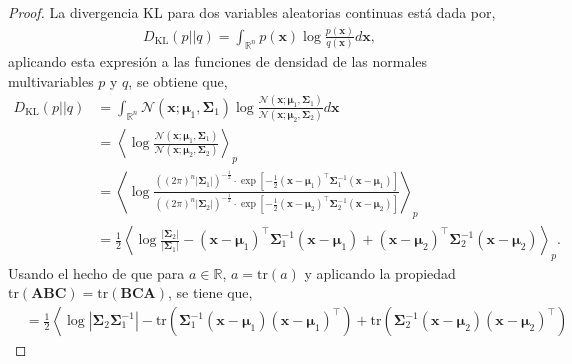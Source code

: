 \begin{proof}
    La divergencia KL para dos variables aleatorias continuas
    está dada por,
    \begin{align}
        D_{\text{KL}}(p||q) = \int_{\mathbb{R}^{n}}p(\mathbf{x})\log \frac{p(\mathbf{x})}{q(\mathbf{x})}d\mathbf{x},
    \end{align}
    aplicando esta expresión a las funciones de densidad de las normales multivariables $p$ y $q$, se obtiene que,
\begin{equation} 
    \begin{aligned}
        D_{\text{KL}}(p||q) &= \int_{\mathbb{R}^{n}} 
        \mathcal{N}(\mathbf{x}; \bm{\mu}_1, \bm{\Sigma}_1)
        \log\frac{
        \mathcal{N}(\mathbf{x}; \bm{\mu}_1, \bm{\Sigma}_1)
        }{
        \mathcal{N}(\mathbf{x}; \bm{\mu}_2, \bm{\Sigma}_2)
        }d\mathbf{x} \\
        &= \left\langle 
        \log\frac{
        \mathcal{N}(\mathbf{x}; \bm{\mu}_1, \bm{\Sigma}_1)
        }{
        \mathcal{N}(\mathbf{x}; \bm{\mu}_2, \bm{\Sigma}_2)
        }
        \right\rangle_{p} \\
        &= \left\langle 
        \log \frac{
        \left((2\pi)^{n}|\bm{\Sigma}_1|\right)^{-\frac{1}{2}}
        \cdot 
        \exp\left[- \frac{1}{2}(\mathbf{x} -\bm{\mu}_1)^{\top}\bm{\Sigma}_1^{-1}(\mathbf{x} - \bm{\mu}_1)\right]
        }{
        \left((2\pi)^{n}|\bm{\Sigma}_2|\right)^{-\frac{1}{2}}
        \cdot 
        \exp\left[- \frac{1}{2}(\mathbf{x} -\bm{\mu}_2)^{\top}\bm{\Sigma}_2^{-1}(\mathbf{x} - \bm{\mu}_2)\right]
        }\right\rangle_{p} \\
        &= \frac{1}{2}\left\langle 
        \log\frac{|\bm{\Sigma}_2|}{|\bm{\Sigma}_1|}
        -(\mathbf{x}-\bm{\mu}_1)^{\top}\bm{\Sigma}_{1}^{-1}(\mathbf{x}- \bm{\mu}_1)
        + (\mathbf{x}-\bm{\mu}_2)^{\top}\bm{\Sigma}_{2}^{-1}(\mathbf{x}- \bm{\mu}_2)
        \right\rangle_p.
    \end{aligned}
\end{equation}
Usando el hecho de que para $a \in \mathbb{R}$, $a=\text{tr}(a)$ y aplicando la propiedad $\text{tr}(\mathbf{ABC})=\text{tr}(\mathbf{BCA})$, se tiene que,
\begin{equation}
    \begin{aligned}
        &= \frac{1}{2}\left\langle 
        \log|\bm{\Sigma}_2\bm{\Sigma}_1^{-1}| 
        - \text{tr}\left(\bm{\Sigma}_1^{-1}(\mathbf{x}-\bm{\mu}_1)(\mathbf{x}-\bm{\mu}_1)^{\top} \right)
        + \text{tr}\left(\bm{\Sigma}_2^{-1}(\mathbf{x}-\bm{\mu}_2)(\mathbf{x}-\bm{\mu}_2)^{\top}\right) 

\end{aligned}
\end{equation}
\end{proof}
